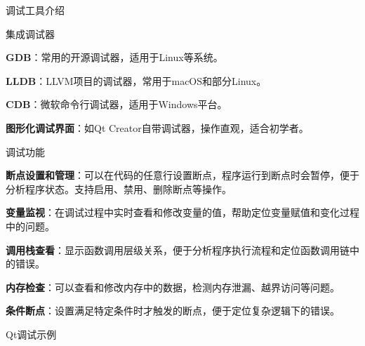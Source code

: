 \documentclass[UTF8,aspectratio=169]{beamer}
\begin{document}
\begin{frame}{调试工具介绍}
    \begin{ytublock}{集成调试器}
        \begin{itemize}
            {\small
            \item \textbf{GDB}：常用的开源调试器，适用于Linux等系统。
            \item \textbf{LLDB}：LLVM项目的调试器，常用于macOS和部分Linux。
            \item \textbf{CDB}：微软命令行调试器，适用于Windows平台。
            \item \textbf{图形化调试界面}：如Qt Creator自带调试器，操作直观，适合初学者。
            }
        \end{itemize}
    \end{ytublock}

    \begin{ytublock}{调试功能}
        \begin{itemize}
            {\small
            \item \textbf{断点设置和管理}：可以在代码的任意行设置断点，程序运行到断点时会暂停，便于分析程序状态。支持启用、禁用、删除断点等操作。
            \item \textbf{变量监视}：在调试过程中实时查看和修改变量的值，帮助定位变量赋值和变化过程中的问题。
            \item \textbf{调用栈查看}：显示函数调用层级关系，便于分析程序执行流程和定位函数调用链中的错误。
            \item \textbf{内存检查}：可以查看和修改内存中的数据，检测内存泄漏、越界访问等问题。
            \item \textbf{条件断点}：设置满足特定条件时才触发的断点，便于定位复杂逻辑下的错误。
            }
        \end{itemize}
    \end{ytublock}
\end{frame}

\begin{frame}[fragile]{Qt调试示例}
        \begin{columns}
            \begin{column}{0.48\textwidth}
                \inputminted[firstline=1,lastline=15]{cpp}{code/main.cpp}
            \end{column}
            \begin{column}{0.48\textwidth}
                \inputminted[firstline=16]{cpp}{code/main.cpp}
            \end{column}
        \end{columns}
\end{frame}
\end{document}
